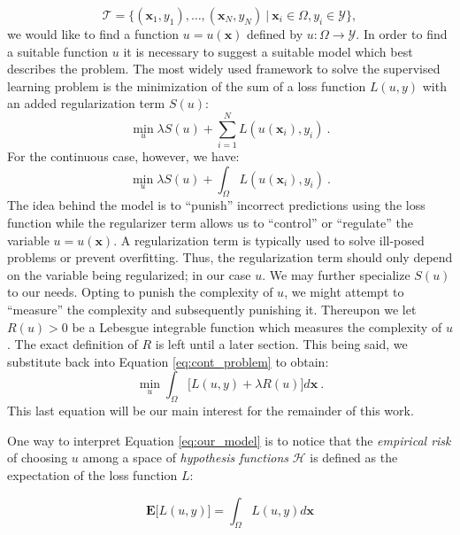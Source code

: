 \documentclass{INGUADY}
\begin{document}
\begin{equation*}
\mathcal{T} = \{  (\mathbf{x}_1, y_1), \ldots, (\mathbf{x}_N, y_N) \  | \  \mathbf{x}_i \in \Omega, y_i \in  \mathcal{Y}\} ,
\end{equation*}
we would like to find a function $u = u(\mathbf{x})$ defined by $u: \Omega \rightarrow \mathcal{Y}$. In order to find a suitable function $u$ it is necessary to suggest a suitable model which best describes the problem. The most widely used framework to solve the supervised learning problem is the minimization of the sum of a loss function $L(u, y)$ with an added regularization term $S(u)$:
\begin{equation*}
\min_u \lambda S(u) + \sum^N_{i=1} L(u(\mathbf{x}_i), y_i) \ .
\end{equation*}
For the continuous case, however, we have:
\begin{equation} \label{eq:cont_problem}
\min_u \lambda S(u) + \int_\Omega L(u(\mathbf{x}_i), y_i) \ .
\end{equation}
The idea behind the model is to ``punish'' incorrect predictions using the loss function while the regularizer term allows us to ``control'' or ``regulate'' the variable $u = u(\mathbf{x})$. A regularization term is typically used to solve ill-posed problems or prevent overfitting. Thus, the regularization term should only depend on the variable being regularized; in our case $u$. We may further specialize $S(u)$ to our needs. Opting to punish the complexity of $u$, we might attempt to  ``measure'' the complexity and subsequently punishing it. Thereupon we let $R(u) > 0$ be a Lebesgue integrable function which measures the complexity of $u$. The exact definition of $R$ is left until a later section. This being said, we substitute back into Equation \ref{eq:cont_problem} to obtain:
\begin{equation} \label{eq:our_model}
\min_u \int_\Omega \Big[  L(u, y) + \lambda R(u)  \Big] d\mathbf{x} \ .
\end{equation}
This last equation will be our main interest for the remainder of this work.

One way to interpret Equation \ref{eq:our_model} is to notice that the \textit{empirical risk} of choosing $u$ among a space of \textit{hypothesis functions} $\mathcal{H}$ is defined as the expectation of the loss function $L$:

\begin{equation*}
\mathbf{E} \big[  L(u, y)  \big] = \int_\Omega L(u, y) d\mathbf{x}
\end{equation*}
\end{document}
